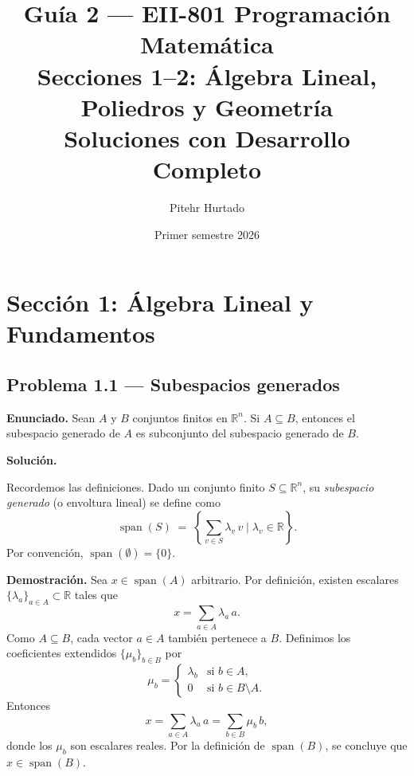 \documentclass{article}
\title{\textbf{Guía 2 --- EII-801 Programación Matemática\\[4pt]
\large Secciones 1--2: Álgebra Lineal, Poliedros y Geometría\\
Soluciones con Desarrollo Completo}}
\author{Pitehr Hurtado}
\date{Primer semestre 2026}
\begin{document}
\maketitle
\tableofcontents
\newpage

\section*{Sección 1: Álgebra Lineal y Fundamentos}

\subsection*{Problema 1.1 — Subespacios generados}

\textbf{Enunciado.} Sean $A$ y $B$ conjuntos finitos en $\mathbb{R}^n$. Si $A \subseteq B$, entonces el subespacio generado de $A$ es subconjunto del subespacio generado de $B$.

\medskip
\noindent\textbf{Solución.}

Recordemos las definiciones. Dado un conjunto finito $S \subseteq \mathbb{R}^n$, su \emph{subespacio generado} (o envoltura lineal) se define como
\[
\operatorname{span}(S) \;=\; \left\{\sum_{v \in S} \lambda_v \, v \;\Big|\; \lambda_v \in \mathbb{R}\right\}.
\]
Por convención, $\operatorname{span}(\emptyset) = \{0\}$.

\medskip
\noindent\textbf{Demostración.} Sea $x \in \operatorname{span}(A)$ arbitrario. Por definición, existen escalares $\{\lambda_a\}_{a \in A} \subset \mathbb{R}$ tales que
\[
x = \sum_{a \in A} \lambda_a \, a.
\]
Como $A \subseteq B$, cada vector $a \in A$ también pertenece a $B$. Definimos los coeficientes extendidos $\{\mu_b\}_{b \in B}$ por
\[
\mu_b = \begin{cases} \lambda_b & \text{si } b \in A, \\ 0 & \text{si } b \in B \setminus A. \end{cases}
\]
Entonces
\[
x = \sum_{a \in A} \lambda_a \, a = \sum_{b \in B} \mu_b \, b,
\]
donde los $\mu_b$ son escalares reales. Por la definición de $\operatorname{span}(B)$, se concluye que $x \in \operatorname{span}(B)$.
\end{document}
